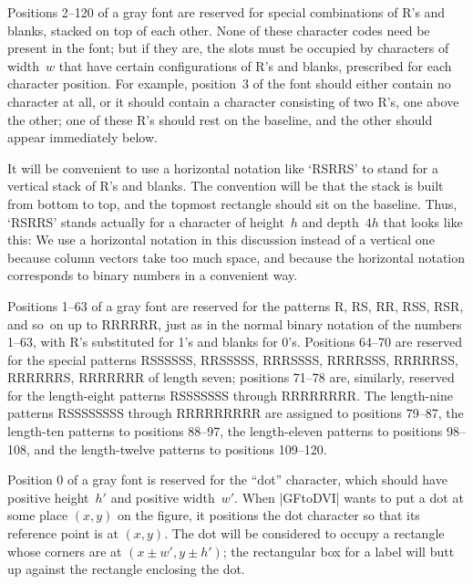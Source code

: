 Positions 2--120 of a gray font are reserved for special combinations of\/
{\manual R}'s and blanks, stacked on top of each other. None of these
character codes need be present in the font; but if they are, the slots
must be occupied by characters of width~$w$ that have certain
configurations of\/ {\manual R}'s and blanks, prescribed for each character
position. For example, position~3 of the font should either contain no
character at all, or it should contain a character consisting of two
{\manual R}'s, one above the other; one of these {\manual R}'s should rest
on the baseline, and the other should appear immediately below.

It will be convenient to use a horizontal notation like `{\manual RSRRS}'
to stand for a vertical stack of\/ {\manual R}'s and blanks. The convention
will be that the stack is built from bottom to top, and the topmost
rectangle should sit on the baseline. Thus, `{\manual RSRRS}' stands
actually for a character of height~$h$ and depth~$4h$ that looks like this:
\begindisplay
\vbox{\offinterlineskip{}}
\enddisplay
We use a horizontal notation in this discussion instead of a vertical one
because column vectors take too much space, and because the horizontal
notation corresponds to binary numbers in a convenient way.

Positions 1--63 of a gray font are reserved for the patterns {\manual R},
{\manual RS}, {\manual RR}, {\manual RSS}, {\manual RSR}, and so~on up to
{\manual RRRRRR}, just as in the normal binary notation of the numbers
1--63, with {\manual R}'s substituted for 1's and blanks for 0's.
Positions 64--70 are reserved for the special patterns {\manual RSSSSSS},
{\manual RRSSSSS}, {\manual RRRSSSS}, {\manual RRRRSSS}, {\manual
RRRRRSS}, {\manual RRRRRRS}, {\manual RRRRRRR} of length seven; positions
71--78 are, similarly, reserved for the length-eight patterns {\manual
RSSSSSSS} through {\manual RRRRRRRR}. The length-nine patterns {\manual
RSSSSSSSS} through {\manual RRRRRRRRR} are assigned to positions 79--87,
the length-ten patterns to positions 88--97, the length-eleven patterns to
positions 98--108, and the length-twelve patterns to positions 109--120.

Position 0 of a gray font is reserved for the ``dot'' character, which
should have positive height~$h'$ and positive width~$w'$. When |GFtoDVI|
wants to put a dot at some place $(x,y)$ on the figure, it positions
the dot character so that its reference point is at $(x,y)$. The
dot will be considered to occupy a rectangle whose corners are at
$(x\pm w',y\pm h')$; the rectangular
box for a label will butt up against the rectangle enclosing the dot.

